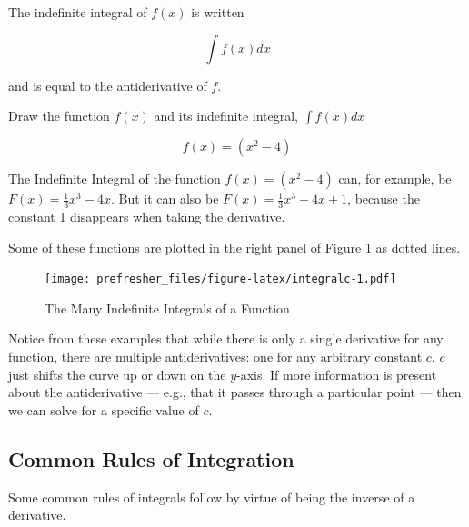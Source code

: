 \documentclass[]{book}
\theoremstyle{definition}
\theoremstyle{definition}
\theoremstyle{definition}
\theoremstyle{remark}
\let\BeginKnitrBlock\begin \let\EndKnitrBlock\end
\begin{document}
\BeginKnitrBlock{definition}[Indefinite Integral]
\protect\hypertarget{def:unnamed-chunk-22}{}{\label{def:unnamed-chunk-22} {} }The indefinite integral of \(f(x)\) is written

\[\int f(x) dx \]

and is equal to the antiderivative of \(f\).
\EndKnitrBlock{definition}

\BeginKnitrBlock{example}
\protect\hypertarget{exm:unnamed-chunk-23}{}{\label{exm:unnamed-chunk-23} }Draw the function \(f(x)\) and its indefinite integral, \(\int\limits f(x) dx\)

\[f(x) = (x^2-4)\]
\EndKnitrBlock{example}

\BeginKnitrBlock{solution}
{}The Indefinite Integral of the function \(f(x) = (x^2-4)\) can, for example, be \(F(x) = \frac{1}{3}x^3 - 4x.\) But it can also be \(F(x) = \frac{1}{3}x^3 - 4x + 1\), because the constant 1 disappears when taking the derivative.
\EndKnitrBlock{solution}

Some of these functions are plotted in the right panel of Figure \ref{fig:integralc} as dotted lines.

\begin{figure}
\centering
\texttt{[image: prefresher\_files/figure-latex/integralc-1.pdf]}
\caption{\label{fig:integralc}The Many Indefinite Integrals of a Function}
\end{figure}

Notice from these examples that while there is only a single derivative for any function, there are multiple antiderivatives: one for any arbitrary constant \(c\). \(c\) just shifts the curve up or down on the \(y\)-axis. If more information is present about the antiderivative --- e.g., that it passes through a particular point --- then we can solve for a specific value of \(c\).

\hypertarget{common-rules-of-integration}{%
\subsection*{Common Rules of Integration}\label{common-rules-of-integration}}

Some common rules of integrals follow by virtue of being the inverse of a derivative.
\end{document}
